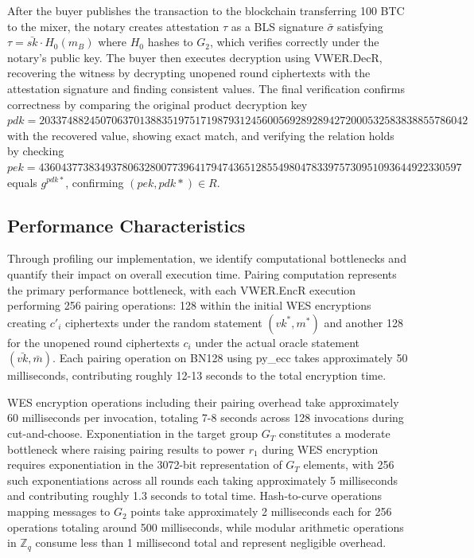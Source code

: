 \documentclass[11pt,a4paper]{article}
\newcommand{\ZZ}{\mathbb{Z}}
\begin{document}
{After the buyer publishes the transaction to the blockchain transferring 100 BTC to the mixer, the notary creates attestation $\tau$ as a BLS signature $\bar{\sigma}$ satisfying $\tau = \bar{sk} \cdot H_0(m_B)$ where $H_0$ hashes to $G_2$, which verifies correctly under the notary's public key. The buyer then executes decryption using VWER.DecR, recovering the witness by decrypting unopened round ciphertexts with the attestation signature and finding consistent values. The final verification confirms correctness by comparing the original product decryption key \\
$pdk = 20337488245070637013883519751719879312456005692892894272000532583838855786042$ with the recovered value, showing exact match, and verifying the relation holds by checking $pek = 4360437738349378063280077396417947436512855498047833975730951093644922330597$ equals $g^{pdk*}$, confirming $(pek, pdk*) \in R$.

\subsection{Performance Characteristics}

Through profiling our implementation, we identify computational bottlenecks and quantify their impact on overall execution time. Pairing computation represents the primary performance bottleneck, with each VWER.EncR execution performing 256 pairing operations: 128 within the initial WES encryptions creating $c'_i$ ciphertexts under the random statement $(vk^*, m^*)$ and another 128 for the unopened round ciphertexts $c_i$ under the actual oracle statement $(\bar{vk}, \bar{m})$. Each pairing operation on BN128 using py\_ecc takes approximately 50 milliseconds, contributing roughly 12-13 seconds to the total encryption time.

WES encryption operations including their pairing overhead take approximately 60 milliseconds per invocation, totaling 7-8 seconds across 128 invocations during cut-and-choose. Exponentiation in the target group $G_T$ constitutes a moderate bottleneck where raising pairing results to power $r_1$ during WES encryption requires exponentiation in the 3072-bit representation of $G_T$ elements, with 256 such exponentiations across all rounds each taking approximately 5 milliseconds and contributing roughly 1.3 seconds to total time. Hash-to-curve operations mapping messages to $G_2$ points take approximately 2 milliseconds each for 256 operations totaling around 500 milliseconds, while modular arithmetic operations in $\ZZ_q$ consume less than 1 millisecond total and represent negligible overhead.

}
\end{document}
